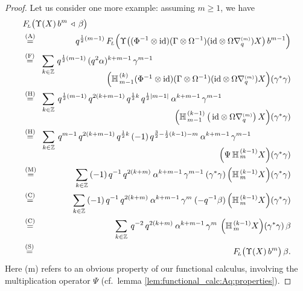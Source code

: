 \begin{proof}
Let us consider one more example: assuming $m\geq 1$, we have
\begin{eqnarray*}
\lefteqn{\FLabb \!\left(\vertM \Upsilon(X)\, b^m \, \ract \,\beta \right) } \\
\!\!\! &\stackrel{\rm (A)}{=}& \!\!
       q^{\frac{1}{2}(m-1)}\, \FLabb \!\left(\vertL
       \Upsilon \! \left(\vertM(\Phi^{-1} \tens \id)(\Gamma \tens \Omega^{-1})
       (\id \tens \Omega \nabq{m})X \right)
       b^{m-1} \right)
\\
\!\!\! &\stackrel{\rm (F)}{=}& \!\!
       \sum_{k\in\ZZ} \, q^{\frac{1}{2}(m-1)} \, (q^2 \alpha)^{k+m-1} \, \gamma^{m-1}
    \hspace{-5.5em}\raisebox{-5ex}{$
       \left(\YaH{m-1}{k} (\Phi^{-1} \tens \id)(\Gamma \tens \Omega^{-1})
       (\id \tens \Omega \nabq{m})X  \right) \! (\gamma^*\gamma) $}
\\
\!\!\! &\stackrel{\rm (H)}{=}& \!\!
       \sum_{k\in\ZZ} \: q^{\frac{1}{2}(m-1)}\, q^{2(k+m-1)} \, q^{\frac{1}{2}k}
       \, q^{\frac{1}{2}|m-1|} \: \alpha^{k+m-1}\, \gamma^{m-1}
    \hspace{-5.6em}\raisebox{-5ex}{$
       \left(\YaH{m-1}{k-1} \left(\vertM \, \id \tens \Omega \nabq{m}\right)X
       \right) \! (\gamma^*\gamma) $}
\\
\!\!\! &\stackrel{\rm (H)}{=}& \!\!
       \sum_{k\in\ZZ} \: q^{m-1}\, q^{2(k+m-1)} \, q^{\frac{1}{2}k}
       \, (-1)\, q^{\frac{3}{2} -\frac{1}{2}(k-1) - m}
       \: \alpha^{k+m-1}\, \gamma^{m-1} \:
    \hspace{-4em}\raisebox{-5ex}{$
       \left(\Psi \,\YaH{m}{k-1}X \right) \! (\gamma^*\gamma) $}
\\
\!\!\! &\stackrel{\rm (M)}{=}& \!\!
       \sum_{k\in\ZZ} \:  (-1)\,q^{-1}\, q^{2(k+m)}
       \: \alpha^{k+m-1}\, \gamma^{m-1} \:
       (\gamma^*\gamma) \left(\YaH{m}{k-1}X \right) \! (\gamma^*\gamma)
\\
\!\!\! &\stackrel{\rm (C)}{=}& \!\!
       \sum_{k\in\ZZ} \:  (-1)\, q^{-1}\, q^{2(k+m)}
       \: \alpha^{k+m-1}\, \gamma^m \:
       (-q^{-1} \beta) \left(\YaH{m}{k-1}X \right) \! (\gamma^*\gamma)
\\
\!\!\! &\stackrel{\rm (C)}{=}& \!\!
       \sum_{k\in\ZZ} \: q^{-2} \, q^{2(k+m)}  \: \alpha^{k+m-1}\, \gamma^m \:
       \left(\YaH{m}{k-1}X \right) \! (\gamma^*\gamma)  \, \beta
\\
\!\!\! &\stackrel{\rm (S)}{=}& \!\!
       \FLabb \!\left(\vertM \Upsilon(X)\, b^m \right) \beta.
\end{eqnarray*}
Here ({\sc m}) refers to an obvious property of our functional calculus,
involving the multiplication operator $\Psi$
(cf.\ lemma \ref{lem:functional_calc:Aq:properties}).
\end{proof}




